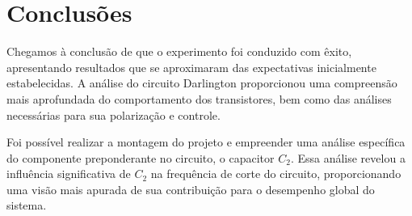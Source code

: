 \section{Conclusões}

Chegamos à conclusão de que o experimento foi conduzido com êxito, apresentando resultados que se aproximaram das expectativas inicialmente estabelecidas. A análise do circuito Darlington proporcionou uma compreensão mais aprofundada do comportamento dos transistores, bem como das análises necessárias para sua polarização e controle.

Foi possível realizar a montagem do projeto e empreender uma análise específica do componente preponderante no circuito, o capacitor $C_2$. Essa análise revelou a influência significativa de $C_2$ na frequência de corte do circuito, proporcionando uma visão mais apurada de sua contribuição para o desempenho global do sistema.